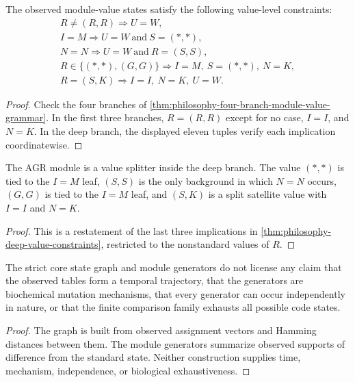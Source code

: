 \begin{theorem}
\label{thm:philosophy-deep-value-constraints}
The observed module-value states satisfy the following value-level
constraints:
$$
\begin{gathered}
  R\neq(R,R)\Rightarrow U=W,\\
  I=M\Rightarrow U=W\ \text{and}\ S=(*,*),\\
  N=N\Rightarrow U=W\ \text{and}\ R=(S,S),\\
  R\in\{(*,*),(G,G)\}\Rightarrow I=M,\ S=(*,*),\ N=K,\\
  R=(S,K)\Rightarrow I=I,\ N=K,\ U=W.
\end{gathered}
$$
\end{theorem}
\begin{proof}
Check the four branches of
\autoref{thm:philosophy-four-branch-module-value-grammar}. In the first
three branches, $R=(R,R)$ except for no case, $I=I$, and $N=K$. In the
deep branch, the displayed eleven tuples verify each implication
coordinatewise.
\end{proof}

\begin{corollary}
\label{cor:philosophy-agr-as-value-splitter}
The AGR module is a value splitter inside the deep branch. The value
$(*,*)$ is tied to the $I=M$ leaf, $(S,S)$ is the only background in
which $N=N$ occurs, $(G,G)$ is tied to the $I=M$ leaf, and $(S,K)$ is a
split satellite value with $I=I$ and $N=K$.
\end{corollary}
\begin{proof}
This is a restatement of the last three implications in
\autoref{thm:philosophy-deep-value-constraints}, restricted to the
nonstandard values of $R$.
\end{proof}

\begin{theorem}
\label{thm:philosophy-core-state-graph-cannot-claim-boundary}
The strict core state graph and module generators do not license any
claim that the observed tables form a temporal trajectory, that the
generators are biochemical mutation mechanisms, that every generator can
occur independently in nature, or that the finite comparison family
exhausts all possible code states.
\end{theorem}
\begin{proof}
The graph is built from observed assignment vectors and Hamming distances
between them. The module generators summarize observed supports of
difference from the standard state. Neither construction supplies time,
mechanism, independence, or biological exhaustiveness.
\end{proof}

